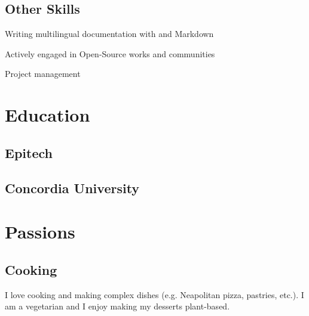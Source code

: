 \documentclass[
  english,
  a4paper
]{resume-openfont}
\begin{document}
\begin{minipage}[t]{0.31\textwidth}
\subsection{Other Skills}
\vspace{2pt}
\vspace{\topsep} %
\begin{tightemize}
  \item Writing multilingual documentation with  and Markdown
  \item Actively engaged in Open-Source works and communities
  \item Project management
\end{tightemize}


\section{Education}

\subsection{Epitech}
\subtitle{Master in Computer Science\\Valedictorian}
\sectionsep

\subsection{Concordia University}
\subtitle{Visiting student in Computer Sciences, Graduate Level}


\section{Passions}

\subsection{Cooking}
I love cooking and making complex dishes (e.g. Neapolitan pizza, pastries, etc.). I am a vegetarian and I enjoy making my desserts plant-based.

\sectionsep


\end{minipage}
\end{document}
